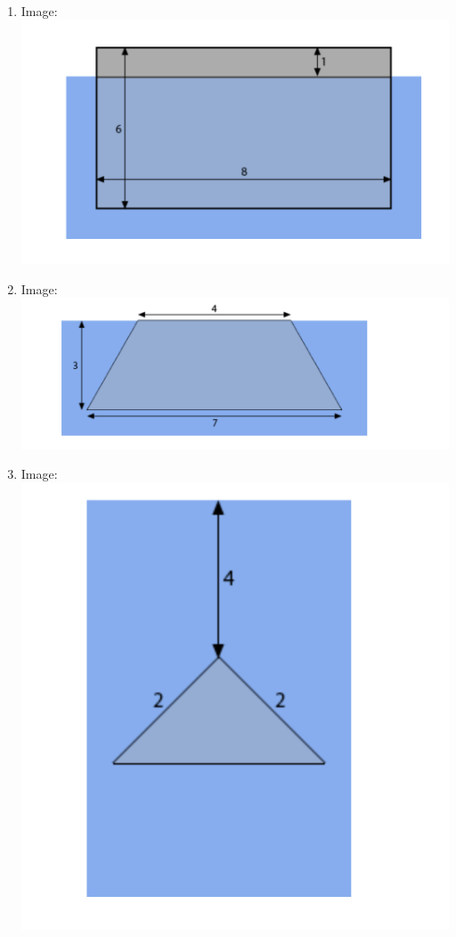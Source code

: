 \begin{enumerate}
	\item Image:
	\newline
			\includegraphics[scale=0.7]{1.png}	
			\vfill
			\newpage
	\item Image:
	\newline
			\includegraphics[scale=0.3]{2.png}	
\vfill
	\item Image:
	\newline
			\includegraphics[scale=0.7]{3.png}
			\vfill
			\newpage

\end{enumerate}
